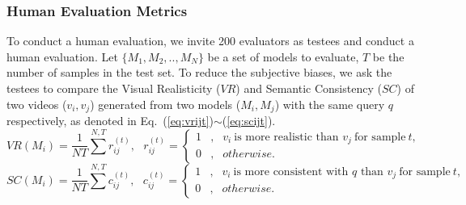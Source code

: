 \documentclass{article}
\begin{document}
\subsubsection{Human Evaluation Metrics} \label{sec:msm}
To conduct a human evaluation, we invite 200 evaluators as testees and conduct a human evaluation.  Let $\{M_1, M_2,.., M_N\}$ be a set of models to evaluate, $T$ be the number of samples in the test set. To reduce the subjective biases, we ask the testees to compare the Visual Realisticity ($VR$) and Semantic Consistency ($SC$) of two videos ($v_i, v_j$) generated from two models ($M_i, M_j$) with the same query $q$ respectively, as denoted in Eq.~(\ref{eq:vrijt})$\sim$(\ref{eq:scijt}).
\begin{equation} \label{eq:vrijt} 
VR(M_i)=\frac{1}{NT}\sum^{N,T} r_{ij}^{(t)},~~~r_{ij}^{(t)}=\left\{
\begin{aligned}
1 & , & v_i~\text{is~more~realistic~than~}v_j~\text{for sample}~t, \\
0 & , & otherwise.
\end{aligned}
\right.
\end{equation}
\begin{equation} \label{eq:scijt} 
 SC(M_i)=\frac{1}{NT}\sum^{N,T} c_{ij}^{(t)},~~~c_{ij}^{(t)}=\left\{
\begin{aligned}
1 & , & v_i~\text{is~more~consistent~with~} q \text{~than~}v_j~\text{for sample}~t, \\
0 & , & otherwise.
\end{aligned}
\right.
\end{equation}




\newcommand{\visuwidth}{1.6cm}
\end{document}
